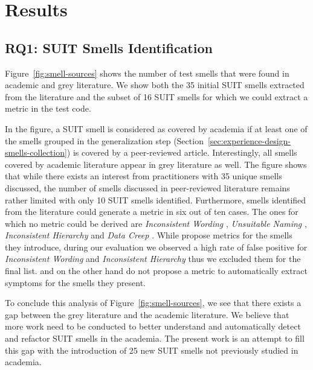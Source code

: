 \section{Results}
\label{sec:results}

\subsection{RQ1: SUIT Smells Identification}
\label{sec:results-smells-collection}

Figure~\ref{fig:smell-sources} shows the number of test smells that were found in academic and grey literature. We show both the 35 initial SUIT smells extracted from the literature and the subset of 16 SUIT smells for which we could extract a metric in the test code.

In the figure, a SUIT smell is considered as covered by academia if at least one of the smells grouped in the generalization step (Section~\ref{sec:experience-design-smells-collection}) is covered by a peer-reviewed article. Interestingly, all smells covered by academic literature appear in grey literature as well. The figure shows that while there exists an interest from practitioners with 35 unique smells discussed, the number of smells discussed in peer-reviewed literature remains rather limited with only 10 SUIT smells identified. Furthermore, smells identified from the literature could generate a metric in six out of ten cases. The ones for which no metric could be derived are \emph{Inconsistent Wording} \cite{Hauptmann2013}, \emph{Unsuitable Naming} \cite{Chen2012}, \emph{Inconsistent Hierarchy} \cite{Hauptmann2013} and \emph{Data Creep} \cite{Alegroth2016b}. While \cite{Hauptmann2013} propose metrics for the smells they introduce, during our evaluation we observed a high rate of false positive for \emph{Inconsistent Wording} and \emph{Inconsistent Hierarchy} thus we excluded them for the final list. \cite{Chen2012} and \cite{Alegroth2016b} on the other hand do not propose a metric to automatically extract symptoms for the smells they present. 

To conclude this analysis of Figure~\ref{fig:smell-sources}, we see that there exists a gap between the grey literature and the academic literature. We believe that more work need to be conducted to better understand and automatically detect and refactor SUIT smells in the academia. The present work is an attempt to fill this gap with the introduction of 25 new SUIT smells not previously studied in academia.

